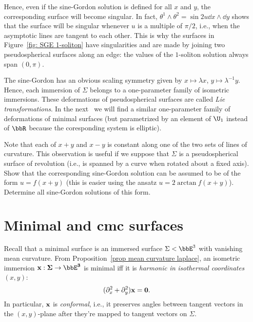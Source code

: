 Hence, even if the sine-Gordon solution is defined for all $x$ and $y$, the corresponding surface will become singular. In fact, $\theta^1\wedge\theta^2=\sin 2u \dd x\wedge \dd y$ shows that the surface will be singular whenever $u$ is a multiple of $\pi/2$, i.e., when the asymptotic lines are tangent to each other. This is why the surfaces in Figure~\ref{fig: SGE 1-soliton} have singularities and are made by joining two pseudospherical surfaces along an edge: the values of the $1$-soliton solution always span $(0,\pi)$.

\begin{rem}
    The sine-Gordon has an obvious scaling symmetry given by $x\mapsto \lambda x$, $y\mapsto \lambda^{-1}y$. Hence, each immersion of $\Sigma$ belongs to a one-parameter family of isometric immersions. These deformations of pseudospherical surfaces are called \emph{Lie transformations}. In the next \sect\ we will find a similar one-parameter family of deformations of minimal surfaces (but parametrized by an element of $\U_1$ instead of $\bbR$ because the coresponding system is elliptic).
\end{rem}

\begin{xca}\label{xca 7.4.19 Ivey}
    Note that each of $x+y$ and $x-y$ is constant along one of the two sets of lines of curvature. 
    This observation is useful if we suppose that $\Sigma$ is a pseudospherical surface of revolution (i.e., is spanned by a curve when rotated about a fixed axis). Show that the corresponding sine-Gordon solution can be assumed to be of the form $u=f(x+y)$ (this is easier using the ansatz $u=2\arctan f(x+y)$). Determine all sine-Gordon solutions of this form. 
\end{xca}







\section{Minimal and \texorpdfstring{\gls{cmc}}{CMC} surfaces}

Recall that a minimal surface is an immersed surface $\Sigma<\bbE^3$ with vanishing mean curvature. From Proposition~\ref{prop mean curvature laplace}, an isometric immersion $\bf{x}:\Sigma\to \bbE^3$ is minimal iff it is \emph{harmonic in isothermal coordinates} $(x,y)$:
\[(\partial_x^2+\partial_y^2)\bf{x}=0.\]
In particular, $\bf{x}$ is \emph{conformal}, i.e., it preserves angles between tangent vectors in the $(x,y)$-plane after they're mapped to tangent vectors on $\Sigma$.

